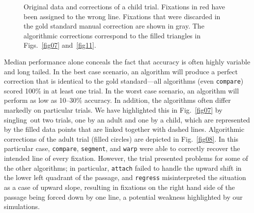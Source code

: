 \documentclass[doc,biblatex]{apa7}
\begin{document}
	\begin{figure}
	\vspace*{2pt}
	\caption{Original data and corrections of a child trial. Fixations in red have been assigned to the wrong line. Fixations that were discarded in the gold standard manual correction are shown in gray. The algorithmic corrections correspond to the filled triangles in Figs.~\ref{fig07} and~\ref{fig11}.}
	\label{fig09}
	\end{figure}

Median performance alone conceals the fact that accuracy is often highly variable and long tailed. In the best case scenario, an algorithm will produce a perfect correction that is identical to the gold standard---all algorithms (even \texttt{compare}) scored 100\% in at least one trial. In the worst case scenario, an algorithm will perform as low as 10--30\% accuracy. In addition, the algorithms often differ markedly on particular trials. We have highlighted this in Fig.~\ref{fig07} by singling~out two trials, one by an adult and one by a child, which are represented by the filled data points that are linked together with dashed lines. Algorithmic corrections of the adult trial (filled circles) are depicted in Fig.~\ref{fig08}. In this particular case, \texttt{compare}, \texttt{segment}, and \texttt{warp} were able to correctly recover the intended line of every fixation. However, the trial presented problems for some of the other algorithms; in particular, \texttt{attach} failed to handle the upward shift in the lower left quadrant of the passage, and \texttt{regress} misinterpreted the situation as a case of upward slope, resulting in fixations on the right hand side of the passage being forced down by one line, a potential weakness highlighted by our simulations.
\end{document}
